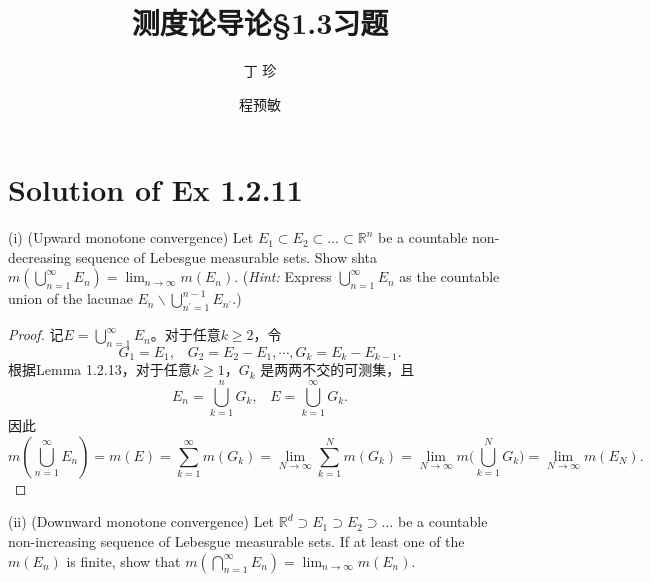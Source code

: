 \documentclass[reqno,a4paper,14pt]{amsart}
\title{\textbf{测度论导论\S1.3习题}}
\author{丁\;\;\; 珍}
\author{程预敏}
\begin{document}
\maketitle
\section{Solution of Ex 1.2.11}
(i) (Upward monotone convergence) Let $E_1\subset E_2\subset \dots \subset \mathbb{R}^n$ be a countable non-decreasing sequence of Lebesgue measurable sets. Show shta $m(\bigcup_{n=1}^\infty E_n)=\lim_{n\to\infty} m(E_n)$. (\textit{Hint:} Express $\bigcup_{n=1}^\infty E_n$ as the countable union of the lacunae $E_n\backslash \bigcup_{n^\prime=1}^{n-1} E_{n^\prime}$.)
\begin{proof}
    记$E=\bigcup_{n=1}^\infty E_n$。对于任意$k\geq 2$，令
    \begin{equation*}
        G_1=E_1,\;\;\; G_2=E_2-E_1, \cdots, G_k=E_k-E_{k-1}.
    \end{equation*}
    根据Lemma 1.2.13，对于任意$k\geq 1$，$G_k$ 是两两不交的可测集，且
    \begin{equation*}
        E_n=\bigcup_{k=1}^n G_k,\;\;\; E=\bigcup_{k=1}^\infty G_k.
    \end{equation*}
    因此
    \begin{equation*}
        m(\bigcup_{n=1}^\infty E_n)=m(E)=\sum_{k=1}^\infty m(G_k)=\lim_{N\to\infty} \sum_{k=1}^N m(G_k)=\lim_{N\to\infty}m\biggl(\bigcup_{k=1}^N G_k\biggr)=\lim_{N\to\infty}m(E_N).
    \end{equation*}
\end{proof}
(ii) (Downward monotone convergence) Let $\mathbb{R}^d \supset E_1 \supset E_2\supset \dots$ be a countable non-increasing sequence of Lebesgue measurable sets. If at least one of the $m(E_n)$ is finite, show that $m(\bigcap_{n=1}^\infty E_n)=\lim_{n\to \infty} m(E_n)$.
\end{document}
